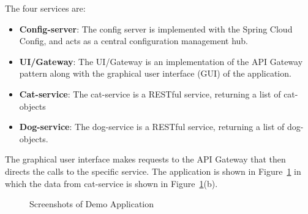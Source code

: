 \noindent The four services are:
\begin{itemize}
  \item \textbf{Config-server}: The config server is implemented with the Spring Cloud Config, and acts as a central configuration management hub.
  \item \textbf{UI/Gateway}: The UI/Gateway is an implementation of the API Gateway pattern along with the graphical user interface (GUI) of the application.  
  \item \textbf{Cat-service}: The cat-service is a RESTful service, returning a list of cat-objects 
  \item \textbf{Dog-service}: The dog-service is a RESTful service, returning a list of dog-objects.
\end{itemize}

\noindent 
The graphical user interface makes requests to the API Gateway that then directs the calls to the specific service. The application is shown in Figure~\ref{fig:example} in which the data from cat-service is shown in Figure~\ref{fig:example}(b).

\begin{figure}[H]%
    \centering
    \qquad
    \caption{Screenshots of Demo Application}%
    \label{fig:example}%
\end{figure}

